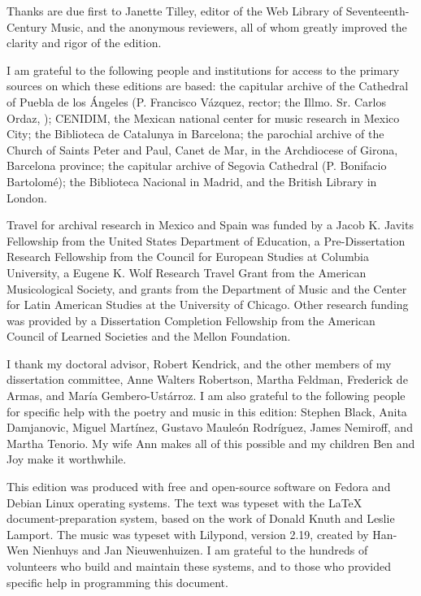 
Thanks are due first to Janette Tilley, editor of the Web Library of
Seventeenth-Century Music, and the anonymous reviewers, all of whom greatly
improved the clarity and rigor of the edition.

I am grateful to the following people and institutions for access to the 
primary sources on which these editions are based: 
the capitular archive of the Cathedral of Puebla de los Ángeles (P. Francisco 
Vázquez, rector; the Illmo. Sr. Carlos Ordaz, );
CENIDIM, the Mexican national center for music research in Mexico City;
the Biblioteca de Catalunya in Barcelona;
the parochial archive of the Church of Saints Peter and Paul, Canet de Mar, in 
the Archdiocese of Girona, Barcelona province;
the capitular archive of Segovia Cathedral (P. Bonifacio Bartolomé);
the Biblioteca Nacional in Madrid, and
the British Library in London.

Travel for archival research in Mexico and Spain was funded by 
a Jacob K. Javits Fellowship from the United States Department of Education, 
a Pre-Dissertation Research Fellowship from the Council for European Studies at 
Columbia University, 
a Eugene K. Wolf Research Travel Grant from the American Musicological Society, 
and grants from the Department of Music and the Center for Latin American 
Studies at the University of Chicago.
Other research funding was provided by a Dissertation Completion Fellowship 
from the American Council of Learned Societies and the Mellon Foundation.

I thank my doctoral advisor, Robert Kendrick, and the other members of my 
dissertation committee, Anne Walters Robertson, Martha Feldman, Frederick de 
Armas, and María Gembero-Ustárroz.
I am also grateful to the following people for specific help with the poetry 
and music in this edition:
Stephen Black,
Anita Damjanovic, 
Miguel Martínez, 
Gustavo Mauleón Rodríguez,
James Nemiroff, and
Martha Tenorio.
My wife Ann makes all of this possible and my children Ben and Joy make it
worthwhile.


This edition was produced with free and open-source software on Fedora and
Debian Linux operating systems.
The text was typeset with the \LaTeX{} document-preparation system, based on 
the work of Donald Knuth and Leslie Lamport.
The music was typeset with Lilypond, version 2.19, created by Han-Wen Nienhuys
and Jan Nieuwenhuizen.
I am grateful to the hundreds of volunteers who build and maintain these 
systems, and to those who provided specific help in programming this document.

